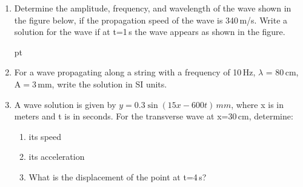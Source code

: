 \documentclass[a4paper,12pt]{letter}
\begin{document}
\begin{enumerate}

\item Determine the amplitude, frequency, and wavelength of the wave shown in the figure below, if the propagation speed of the wave is 340\,m/s. Write a solution for the wave if at t=1\,s the wave appears as shown in the figure.

\begin{center}
 pt
\end{center}


\item For a wave propagating along a string with a frequency of 10\,Hz, $\lambda$ = 80\,cm, A$=$3\,mm, write the solution in SI units.

  

\item A wave solution is given by $y = 0.3 \sin(15x - 600t)\,mm$, where x is in meters and t is in seconds. For the transverse wave at x=30\,cm, determine:
\begin{enumerate}
\item[a)] its speed
\item[b)] its acceleration
\item[c)] What is the displacement of the point at t=4\,s?
\end{enumerate}

  

\end{enumerate}

\bigskip


\vfill
\end{document}
